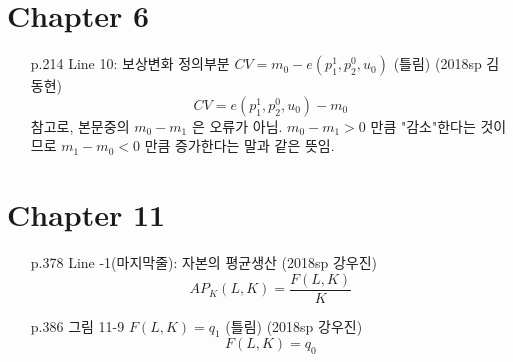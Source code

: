 \documentclass[a4paper,11pt]{article}
\begin{document}
\section{Chapter 6} %
\label{sec:chapter_6}
\begin{itemize}
	\item [p.214] Line 10: 보상변화 정의부분 $CV=m_0 - e(p_1^1,p_2^0,u_0)$ (틀림) (2018sp 김동현)
	\[
		CV= e(p_1^1,p_2^0,u_0) - m_0
	\]
	참고로, 본문중의 $m_0-m_1$ 은 오류가 아님. $m_0-m_1>0$ 만큼 "감소"한다는 것이므로 $m_1-m_0<0$ 만큼 증가한다는 말과 같은 뜻임. 
\end{itemize}

\section{Chapter 11} %
\label{sec:chapter_11}
\begin{itemize}
	\item [p.378] Line -1(마지막줄): 자본의 평균생산 (2018sp 강우진)
	\[
		AP_K (L,K) = \frac{F(L,K)}{K}
	\]
	\item [p.386] 그림 11-9 $F(L,K)=q_1$ (틀림) (2018sp 강우진)
	\[
		F(L,K)=q_0
	\]
\end{itemize}
\end{document}
